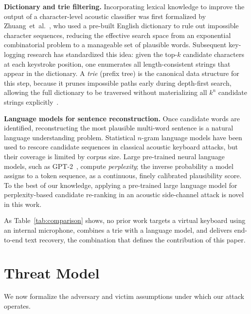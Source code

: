 \documentclass[conference]{IEEEtran}
\begin{document}
\textbf{Dictionary and trie filtering.}
Incorporating lexical knowledge to improve the output of a character-level acoustic classifier was first formalized by Zhuang~et~al.~\cite{zhuang2005}, who used a pre-built English dictionary to rule out impossible character sequences, reducing the
effective search space from an exponential combinatorial problem to a manageable set of plausible words. Subsequent key-logging research has standardized this idea: given the top-$k$ candidate characters at each keystroke position, one enumerates all length-consistent strings that appear in the dictionary.
A \emph{trie} (prefix tree) is the canonical data structure for this
step, because it prunes impossible paths early during depth-first
search, allowing the full dictionary to be traversed without
materializing all $k^{n}$ candidate strings explicitly~\cite{zhuang2005}.

\textbf{Language models for sentence reconstruction.}
Once candidate words are identified, reconstructing the most
plausible multi-word sentence is a natural language understanding
problem. Statistical $n$-gram language models have been used to rescore candidate sequences in classical acoustic keyboard attacks, but their coverage is limited by corpus size.
Large pre-trained neural language models, such as GPT-2~\cite{radford2019gpt2}, compute \emph{perplexity}; the
inverse probability a model assigns to a token sequence, as a
continuous, finely calibrated plausibility score.
To the best of our knowledge, applying a pre-trained large language model for perplexity-based candidate re-ranking in an acoustic
side-channel attack is novel in this work.



As Table~\ref{tab:comparison} shows, no prior work targets a virtual
keyboard using an internal microphone, combines a trie with a
language model, and delivers end-to-end text recovery, the
combination that defines the contribution of this paper.



\section{Threat Model}\label{sec:model}

We now formalize the adversary and victim assumptions under which
our attack operates.
\end{document}

